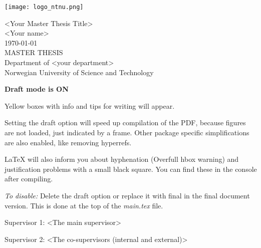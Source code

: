 \thispagestyle{empty}
\texttt{[image: logo\_ntnu.png]}
\mbox{}\\[6pc]
\begin{center}
\Huge{<Your Master Thesis Title>}\\[2pc]

\Large{<Your name>}\\[1pc]
\large{\monthyeardate\today}\\[2pc]

MASTER THESIS\\
Department of <your department>\\
Norwegian University of Science and Technology
\end{center}

\begin{info}
	\textbf{Draft mode is ON}

	Yellow boxes with info and tips for writing will appear.

	Setting the draft option will speed up compilation of the PDF, because figures are not loaded, just indicated by a frame. Other package specific simplifications are also enabled, like removing hyperrefs. 

	LaTeX will also inform you about hyphenation (Overfull hbox warning) and justification problems with a small black square. You can find these in the console after compiling.

	\emph{To disable:} Delete the draft option or replace it with final in the final document version. This is done at the top of the \emph{main.tex} file.
\end{info}

\vfill

\noindent Supervisor 1: <The main supervisor>

\noindent Supervisor 2: <The co-supervisors (internal and external)> %

